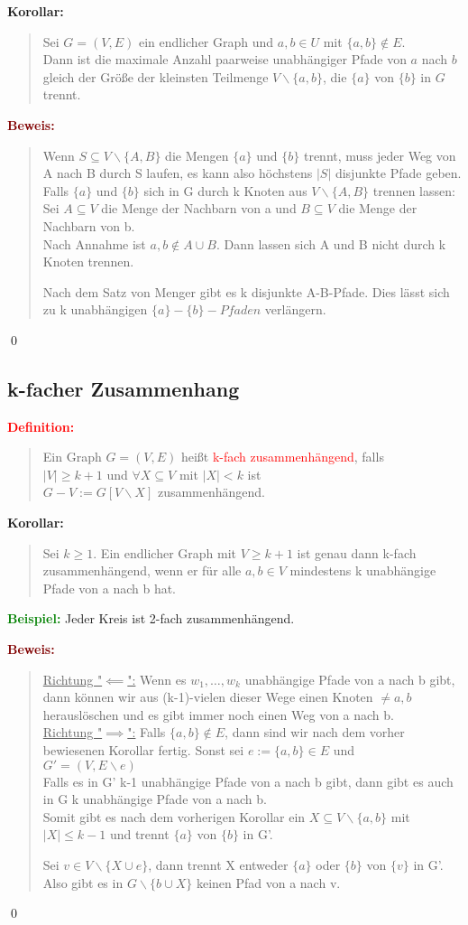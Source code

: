 \documentclass{article}
\newcommand{\red}[1]{\textcolor{red}{#1}}
\newcommand{\green}[1]{\textcolor{green}{#1}}
\newcommand{\dgr}[1]{\textcolor{dgr}{#1}}
\newcommand{\maroon}[1]{\textcolor{maroon}{#1}}
\newcommand{\ex}{\green{\textbf{Beispiel: }}}
\newcommand{\de}[1]{\red{\textbf{Definition: }}\begin{quote}#1\end{quote}}
\newcommand{\co}[1]{\dgr{\textbf{Korollar: }}\begin{quote}#1\end{quote}}
\newcommand{\pr}[1]{\maroon{\textbf{Beweis: }}\begin{quote}#1\end{quote}\qed}
\begin{document}
\co{
    Sei $G=(V,E)$ ein endlicher Graph und $a,b \in U$ mit $\{a,b\} \notin E$.\\
    Dann ist die maximale Anzahl paarweise unabhängiger Pfade von $a$ nach $b$ gleich der Größe der kleinsten Teilmenge $V \backslash \{a,b\}$, die $\{a\}$ von $\{b\}$ in $G$ trennt.
}

\pr{
    Wenn $S \subseteq V \backslash \{A,B\}$ die Mengen $\{a\}$ und $\{b\}$ trennt, muss jeder Weg von A nach B durch S laufen, es kann also höchstens $|S|$ disjunkte Pfade geben.\\
    Falls $\{a\}$ und $\{b\}$ sich in G  durch k Knoten aus $V \backslash \{A,B\}$ trennen lassen:\\
    Sei $A \subseteq V$ die Menge der Nachbarn von a und $B \subseteq V$ die Menge der Nachbarn von b.\\
    Nach Annahme ist $a,b \notin A \cup B$. Dann lassen sich A und B nicht durch k Knoten trennen.

    Nach dem Satz von Menger gibt es k disjunkte A-B-Pfade. Dies lässt sich zu k unabhängigen $\{a\}-\{b\}-Pfaden$ verlängern.
}

\newpage
\subsection{k-facher Zusammenhang}

\de{
    Ein Graph $G=(V,E)$ heißt \red{k-fach zusammenhängend}, falls\\
    $|V| \ge k+1$ und $\forall X \subseteq V$ mit $|X| < k$ ist\\
    $G-V := G[V \backslash X]$ zusammenhängend.
}

\co{
    Sei $k \ge 1$. Ein endlicher Graph mit $V \ge k+1$ ist genau dann k-fach zusammenhängend, wenn er für alle $a,b \in V$ mindestens k unabhängige Pfade von a nach b hat.
}

\ex Jeder Kreis ist 2-fach zusammenhängend.

\pr{
    \underline{Richtung "$\impliedby$":} Wenn es $w_1, \dots, w_k$ unabhängige Pfade von a nach b gibt, dann können wir aus (k-1)-vielen dieser Wege einen Knoten $\ne a,b$ herauslöschen und es gibt immer noch einen Weg von a nach b.\\
    \underline{Richtung "$\implies$":} Falls $\{a,b\} \notin E$, dann sind wir nach dem vorher bewiesenen Korollar fertig.
    Sonst sei $e:=\{a,b\} \in E$ und\\
    $G' = (V, E \backslash e)$\\
    Falls es in G' k-1 unabhängige Pfade von a nach b gibt, dann gibt es auch in G k unabhängige Pfade von a nach b.\\
    Somit gibt es nach dem vorherigen Korollar ein $X \subseteq V \backslash \{a,b\}$ mit $|X| \le k-1$ und  trennt $\{a\}$ von $\{b\}$ in G'.

    Sei $v \in V \backslash \{X \cup e\}$, dann trennt X entweder $\{a\}$ oder $\{b\}$ von $\{v\}$ in G'.\\
    Also gibt es in $G \backslash \{b \cup X\}$ keinen Pfad von a nach v.
}
\end{document}
